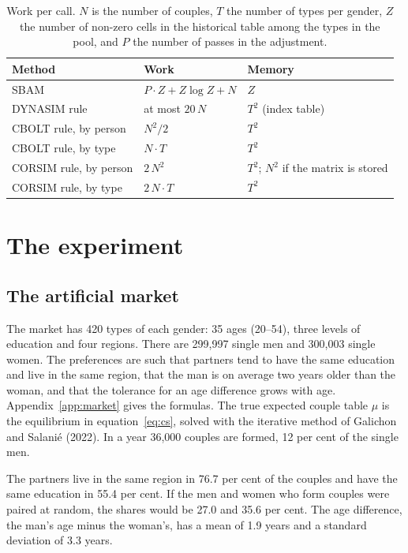 \documentclass[12pt,a4paper]{article}
\begin{document}
\begin{table}[H]
\centering
\caption{Work per call. $N$ is the number of couples, $T$ the number of types per gender, $Z$ the
number of non-zero cells in the historical table among the types in the pool, and $P$ the number
of passes in the adjustment.}
\label{tab:complexity}
\small
\begin{tabular}{@{}lll@{}}
\toprule
Method & Work & Memory \\
\midrule
SBAM & $P \cdot Z + Z \log Z + N$ & $Z$ \\
DYNASIM rule & at most $20\,N$ & $T^2$ (index table) \\
CBOLT rule, by person & $N^2 / 2$ & $T^2$ \\
CBOLT rule, by type & $N \cdot T$ & $T^2$ \\
CORSIM rule, by person & $2\,N^2$ & $T^2$; $N^2$ if the matrix is stored \\
CORSIM rule, by type & $2\,N \cdot T$ & $T^2$ \\
\bottomrule
\end{tabular}
\end{table}

\section{The experiment}\label{sec:design}

\subsection{The artificial market}

The market has 420 types of each gender: 35 ages (20--54), three levels of education and four
regions. There are 299,997 single men and 300,003 single women. The preferences are such that
partners tend to have the same education and live in the same region, that the man is on average
two years older than the woman, and that the tolerance for an age difference grows with age.
Appendix~\ref{app:market} gives the formulas. The true expected couple table $\mu$ is the
equilibrium in equation~\eqref{eq:cs}, solved with the iterative method of Galichon and Salanié
(2022). In a year 36,000 couples are formed, 12 per cent of the single men.

The partners live in the same region in 76.7 per cent of the couples and have the same education
in 55.4 per cent. If the men and women who form couples were paired at random, the shares would
be 27.0 and 35.6 per cent. The age difference, the man's age minus the woman's, has a mean of 1.9
years and a standard deviation of 3.3 years.
\end{document}
